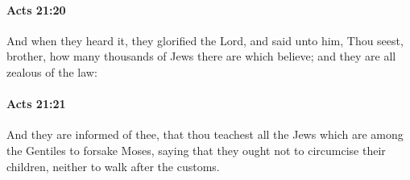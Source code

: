		\paragraph{Acts 21:20} %
			\label{ACTS-21-20}

			And when they heard it, they glorified the Lord, and said unto him, Thou seest, brother, how many thousands of Jews there are which believe; and they are all zealous of the law:

			\begin{framed}
			\scriptsize
				\begin{compactdesc}
					\item[SBLG] 
				\end{compactdesc}
			\end{framed}

		\paragraph{Acts 21:21} %
			\label{ACTS-21-21}

			And they are informed of thee, that thou teachest all the Jews which are among the Gentiles to forsake Moses, saying that they ought not to circumcise their children, neither to walk after the customs.

